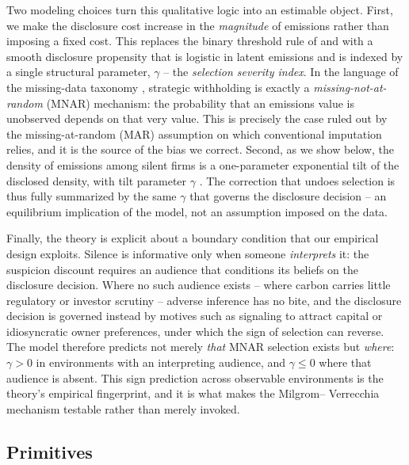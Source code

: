 \documentclass[a4paper,12pt]{article}
\newcommand{\citet}[1]{\textcite{#1}}
\newcommand{\citep}[1]{\parencite{#1}}
\begin{document}
Two modeling choices turn this qualitative logic into an estimable object. First, we make the disclosure cost increase in the \emph{magnitude} of emissions rather than imposing a fixed cost. This replaces the binary threshold rule of \citet{verrecchia1983discretionary} and \citet{dye1985disclosure} with a smooth disclosure propensity that is logistic in latent emissions and is indexed by a single structural parameter, $\gamma$ --  the \emph{selection severity index}. In the language of the missing-data taxonomy \citep{little2019statistical}, strategic withholding is exactly a \emph{missing-not-at-random} (MNAR) mechanism: the probability that an emissions value is unobserved depends on that very value. This is precisely the case ruled out by the missing-at-random (MAR) assumption on which conventional imputation relies, and it is the source of the bias we correct. Second, as we show below, the density of emissions among silent firms is a one-parameter exponential tilt of the disclosed density, with tilt parameter $\gamma$ \citep{kim2011semiparametric}. The correction that undoes selection is thus fully summarized by the same $\gamma$ that governs the disclosure decision --  an equilibrium implication of the model, not an assumption imposed on the data.

Finally, the theory is explicit about a boundary condition that our empirical design exploits. Silence is informative only when someone \emph{interprets} it: the suspicion discount requires an audience that conditions its beliefs on the disclosure decision. Where no such audience exists --  where carbon carries little regulatory or investor scrutiny --  adverse inference has no bite, and the disclosure decision is governed instead by motives such as signaling to attract capital or idiosyncratic owner preferences, under which the sign of selection can reverse. The model therefore predicts not merely \emph{that} MNAR selection exists but \emph{where}: $\gamma > 0$ in environments with an interpreting audience, and $\gamma \leq 0$ where that audience is absent. This sign prediction across observable environments is the theory's empirical fingerprint, and it is what makes the Milgrom-- Verrecchia mechanism testable rather than merely invoked.

\subsection{Primitives}
\label{subsec:primitives}
\end{document}
